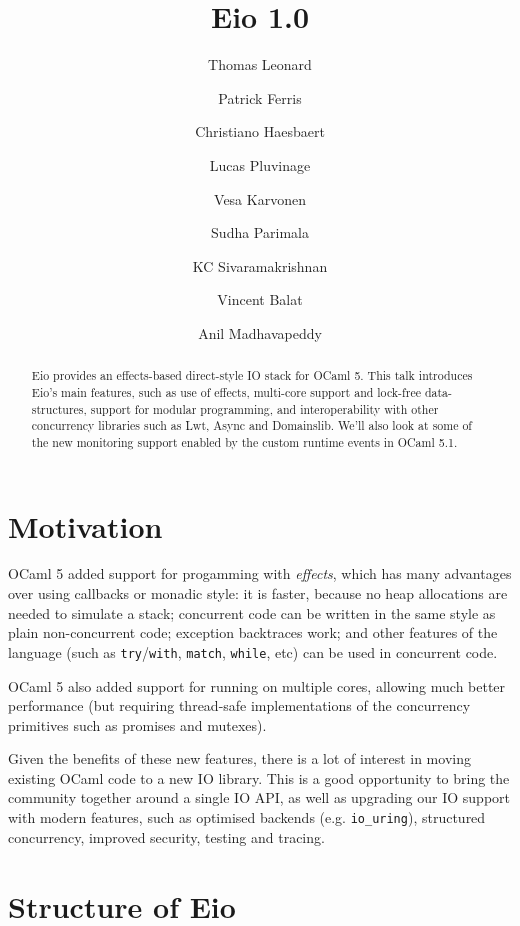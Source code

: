 \documentclass[a4paper,twocolumn]{article}
\begin{document}
\title{Eio 1.0}
\author{Thomas Leonard\and
        Patrick Ferris\and
        Christiano Haesbaert\and
        Lucas Pluvinage\and
        Vesa Karvonen\and
        Sudha Parimala\and
        KC Sivaramakrishnan\and
	Vincent Balat\and
        Anil Madhavapeddy}
\maketitle

\begin{abstract}

Eio provides an effects-based direct-style IO stack for OCaml 5. This talk introduces Eio's main features, such as use of effects, multi-core support and lock-free data-structures, support for modular programming, and interoperability with other concurrency libraries such as Lwt, Async and Domainslib. We’ll also look at some of the new monitoring support enabled by the custom runtime events in OCaml 5.1.

\end{abstract}

\section*{Motivation}

OCaml 5 added support for progamming with \emph{effects}, which has many advantages over using callbacks or monadic style: it is faster, because no heap allocations are needed to simulate a stack; concurrent code can be written in the same style as plain non-concurrent code; exception backtraces work; and other features of the language (such as {\tt try}/{\tt with}, {\tt match}, {\tt while}, etc) can be used in concurrent code.

OCaml 5 also added support for running on multiple cores,
allowing much better performance
(but requiring thread-safe implementations of the concurrency primitives such as promises and mutexes).

Given the benefits of these new features, there is a lot of interest in moving existing OCaml code to a new IO library.
This is a good opportunity to bring the community together around a single IO API, as well as upgrading our IO support with modern features, such as optimised backends (e.g. \verb|io_uring|), structured concurrency, improved security, testing and tracing.

\section*{Structure of Eio}
\end{document}
